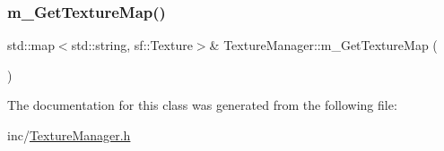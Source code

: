 \mbox{\label{class_texture_manager_a626ba3c25cd4fc4ddacdcd7f6cc4cd3d}} 
\subsubsection{\texorpdfstring{m\+\_\+\+Get\+Texture\+Map()}{m\_GetTextureMap()}}
{\footnotesize\ttfamily std\+::map$<$std\+::string, sf\+::\+Texture$>$\& Texture\+Manager\+::m\+\_\+\+Get\+Texture\+Map (\begin{DoxyParamCaption}{ }\end{DoxyParamCaption})}



The documentation for this class was generated from the following file\+:\begin{DoxyCompactItemize}
\item 
inc/\mbox{\hyperlink{_texture_manager_8h}{Texture\+Manager.\+h}}\end{DoxyCompactItemize}
